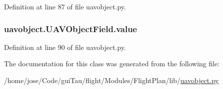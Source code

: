 Definition at line 87 of file uavobject.\-py.

\hypertarget{classuavobject_1_1_u_a_v_object_field_a0fb06dc8a6e619248bd22427a2263e6a}{
\subsubsection[{value}]{\setlength{\rightskip}{0pt plus 5cm}uavobject.\-U\-A\-V\-Object\-Field.\-value}}\label{classuavobject_1_1_u_a_v_object_field_a0fb06dc8a6e619248bd22427a2263e6a}


Definition at line 90 of file uavobject.\-py.



The documentation for this class was generated from the following file\-:\begin{DoxyCompactItemize}
\item 
/home/jose/\-Code/gui\-Tau/flight/\-Modules/\-Flight\-Plan/lib/\hyperlink{uavobject_8py}{uavobject.\-py}\end{DoxyCompactItemize}
